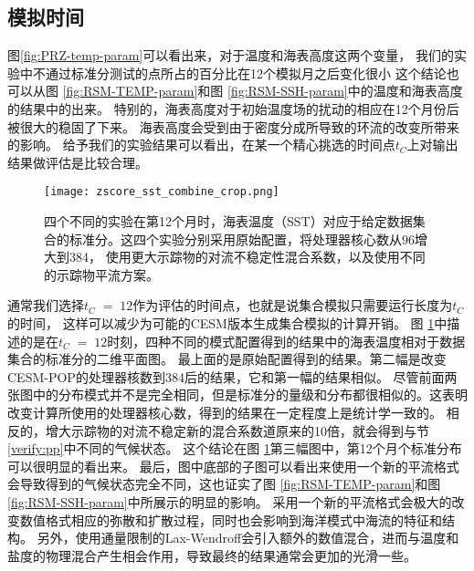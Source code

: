  \subsection{模拟时间}\label{verify:time}
 
图\ref{fig:PRZ-temp-param}可以看出来，对于温度和海表高度这两个变量， 我们的实验中不通过标准分测试的点所占的百分比在12个模拟月之后变化很小
这个结论也可以从图 \ref{fig:RSM-TEMP-param}和图 \ref{fig:RSM-SSH-param}中的温度和海表高度的结果中的出来。 
特别的，海表高度对于初始温度场的扰动的相应在12个月份后被很大的稳固了下来。 
海表高度会受到由于密度分成所导致的环流的改变所带来的影响。
给予我们的实验结果可以看出，在某一个精心挑选的时间点$t_C$上对输出结果做评估是比较合理。 

  
\begin{figure}
\centering
\texttt{[image: zscore\_sst\_combine\_crop.png]}
\caption{四个不同的实验在第12个月时，海表温度（SST）对应于给定数据集合的标准分。这四个实验分别采用原始配置，将处理器核心数从96增大到384， 使用更大示踪物的对流不稳定性混合系数，以及使用不同的示踪物平流方案。}
\label {fig:zscore-combine}
\end{figure}

通常我们选择$t_C \;=\; 12$作为评估的时间点，也就是说集合模拟只需要运行长度为$t_C$的时间， 这样可以减少为可能的CESM版本生成集合模拟的计算开销。
 图 \ref{fig:zscore-combine}中描述的是在$t_C \;=\; 12$时刻，四种不同的模式配置得到的结果中的海表温度相对于数据集合的标准分的二维平面图。
 最上面的是原始配置得到的结果。第二幅是改变CESM-POP的处理器核数到384后的结果，它和第一幅的结果相似。
 尽管前面两张图中的分布模式并不是完全相同，但是标准分的量级和分布都很相似的。这表明改变计算所使用的处理器核心数，得到的结果在一定程度上是统计学一致的。
 相反的，增大示踪物的对流不稳定新的混合系数道原来的10倍，就会得到与节\ref{verify:pp}中不同的气候状态。
 这个结论在图 \ref{fig:zscore-combine}第三幅图中，第12个月个标准分布可以很明显的看出来。 
 最后，图中底部的子图可以看出来使用一个新的平流格式会导致得到的气候状态完全不同，这也证实了图 \ref{fig:RSM-TEMP-param}和图 \ref{fig:RSM-SSH-param}中所展示的明显的影响。 
 采用一个新的平流格式会极大的改变数值格式相应的弥散和扩散过程\cite{tseng2008}，同时也会影响到海洋模式中海流的特征和结构\cite{tseng2006}。
 另外，使用通量限制的Lax-Wendroff会引入额外的数值混合，进而与温度和盐度的物理混合产生相会作用，导致最终的结果通常会更加的光滑一些。



